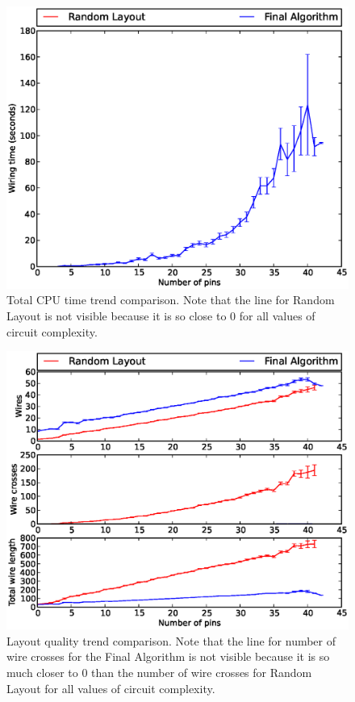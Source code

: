 \begin{figure}
\begin{center}
\includegraphics[width=\textwidth]{Images/final_algorithm_time_trend.eps}
\caption[Combined algorithm time trend]{Total CPU time trend comparison.
Note that the line for Random Layout is
not visible because it is so close to $0$ for all values of circuit complexity.}
\label{fig:final_time_trend}
\end{center}
\end{figure}

\begin{figure}
\begin{center}
\includegraphics[width=\textwidth]{Images/final_algorithm_quality_trend.eps}
\caption[Combined algorithm layout quality trend]{Layout quality trend
comparison. Note that the line for number of wire crosses for the Final
Algorithm is not visible because it is so much closer to $0$ than the number
of wire crosses for Random Layout for all values of circuit complexity.}
\label{fig:final_quality_trend}
\end{center}
\end{figure}

